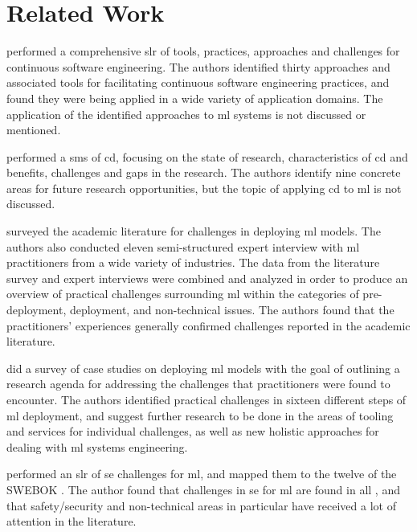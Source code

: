 \chapter{Related Work}
\label{ch:related_work}

\textcite{Shahin2017} performed a comprehensive \acrfull{slr} of tools, practices, approaches and challenges for continuous software engineering.
The authors identified thirty approaches and associated tools for facilitating continuous software engineering practices, and found they were being applied in a wide variety of application domains.
The application of the identified approaches to \acrshort{ml} systems is not discussed or mentioned.

\textcite{Rodriguez2017} performed a \acrfull{sms} of \acrfull{cd}, focusing on the state of research, characteristics of \acrshort{cd} and benefits, challenges and gaps in the research.
The authors identify nine concrete areas for future research opportunities, but the topic of applying \acrshort{cd} to \acrshort{ml} is not discussed.

\textcite{Baier2019} surveyed the academic literature for challenges in deploying \acrshort{ml} models.
The authors also conducted eleven semi-structured expert interview with \acrshort{ml} practitioners from a wide variety of industries.
The data from the literature survey and expert interviews were combined and analyzed in order to produce an overview of practical challenges surrounding \acrshort{ml} within the categories of pre-deployment, deployment, and non-technical issues.
The authors found that the practitioners' experiences generally confirmed challenges reported in the academic literature.

\textcite{Paleyes2020} did a survey of case studies on deploying \acrshort{ml} models with the goal of outlining a research agenda for addressing the challenges that practitioners were found to encounter.
The authors identified practical challenges in sixteen different steps of \acrshort{ml} deployment, and suggest further research to be done in the areas of tooling and services for individual challenges, as well as new holistic approaches for dealing with \acrshort{ml} systems engineering.

\textcite{Kumeno2020} performed an \acrshort{slr} of \acrshort{se} challenges for \acrshort{ml}, and mapped them to the twelve  of the SWEBOK \cite{Bourque2014}.
The author found that challenges in \acrshort{se} for \acrshort{ml} are found in all , and that safety/security and non-technical areas in particular have received a lot of attention in the literature.


